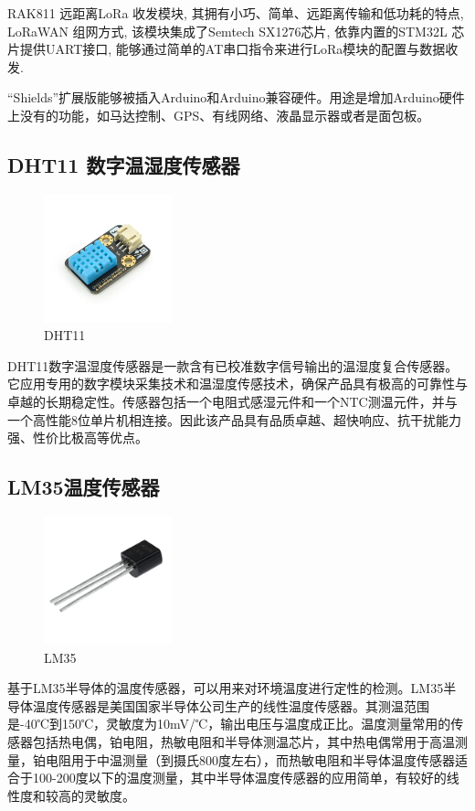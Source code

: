 \documentclass[scheme=chinese,a4paper]{article}
\begin{document}
RAK811 远距离LoRa 收发模块, 其拥有小巧、简单、远距离传输和低功耗的特点, LoRaWAN 组网方式, 该模块集成了Semtech SX1276芯片, 依靠内置的STM32L 芯片提供UART接口, 能够通过简单的AT串口指令来进行LoRa模块的配置与数据收发. 

“Shields”扩展版能够被插入Arduino和Arduino兼容硬件。用途是增加Arduino硬件上没有的功能，如马达控制、GPS、有线网络、液晶显示器或者是面包板。
\subsection{DHT11 数字温湿度传感器}
\begin{figure}[H]
\centering
\includegraphics[width=0.33\textwidth]{DHT11.jpg}
\caption{DHT11}
\end{figure}
DHT11数字温湿度传感器是一款含有已校准数字信号输出的温湿度复合传感器。它应用专用的数字模块采集技术和温湿度传感技术，确保产品具有极高的可靠性与卓越的长期稳定性。传感器包括一个电阻式感湿元件和一个NTC测温元件，并与一个高性能8位单片机相连接。因此该产品具有品质卓越、超快响应、抗干扰能力强、性价比极高等优点。
\subsection{LM35温度传感器}
\begin{figure}[H]
\centering
\includegraphics[width=0.33\textwidth]{LM35.jpg}
\caption{LM35}
\end{figure}
基于LM35半导体的温度传感器，可以用来对环境温度进行定性的检测。LM35半导体温度传感器是美国国家半导体公司生产的线性温度传感器。其测温范围是-40℃到150℃，灵敏度为10mV/℃，输出电压与温度成正比。温度测量常用的传感器包括热电偶，铂电阻，热敏电阻和半导体测温芯片，其中热电偶常用于高温测量，铂电阻用于中温测量（到摄氏800度左右），而热敏电阻和半导体温度传感器适合于100-200度以下的温度测量，其中半导体温度传感器的应用简单，有较好的线性度和较高的灵敏度。
\end{document}
